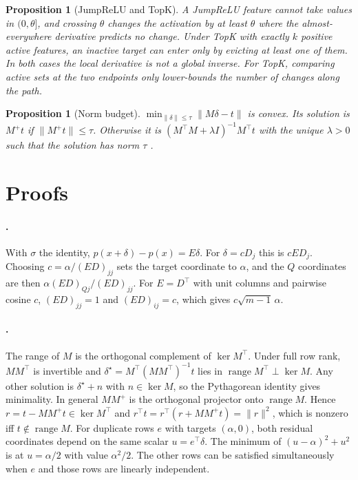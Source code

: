 \documentclass{article}
\theoremstyle{plain}
\newtheorem{proposition}[theorem]{Proposition}
\theoremstyle{definition}
\theoremstyle{remark}
\begin{document}
\begin{proposition}[JumpReLU and TopK]
\label{prop:jump}
A JumpReLU feature cannot take values in $(0,\theta]$, and crossing $\theta$ changes the
activation by at least $\theta$ where the almost-everywhere derivative predicts no change.
Under TopK with exactly $k$ positive active features, an inactive target can enter only by
evicting at least one of them. In both cases the local derivative is not a global inverse.
For TopK, comparing active sets at the two endpoints only lower-bounds the number of
changes along the path.
\end{proposition}

\begin{proposition}[Norm budget]
\label{prop:tr}
$\min_{\|\delta\|\le\tau}\|M\delta - t\|$ is convex. Its solution is $M^{+}t$ if
$\|M^{+}t\|\le\tau$. Otherwise it is $(M^{\top}M+\lambda I)^{-1}M^{\top}t$ with the unique
$\lambda>0$ such that the solution has norm $\tau$ \citep{more1983computing}.
\end{proposition}

\section{Proofs}
\label{app:proofs}
\paragraph{.}
With $\sigma$ the identity, $p(x+\delta) - p(x) = E\delta$. For $\delta = cD_j$ this is
$cED_j$. Choosing $c = \alpha/(ED)_{jj}$ sets the target coordinate to $\alpha$, and the
$Q$ coordinates are then $\alpha(ED)_{Qj}/(ED)_{jj}$. For $E = D^{\top}$ with unit columns
and pairwise cosine $c$, $(ED)_{jj} = 1$ and $(ED)_{ij} = c$, which gives
$c\sqrt{m-1}\,\alpha$.

\paragraph{.}
The range of $M$ is the orthogonal complement of $\ker M^{\top}$. Under full row rank,
$MM^{\top}$ is invertible and $\delta^\star = M^{\top}(MM^{\top})^{-1}t$ lies in
$\operatorname{range}M^{\top}\perp\ker M$. Any other solution is $\delta^\star + n$ with
$n\in\ker M$, so the Pythagorean identity gives minimality. In general $MM^{+}$ is the
orthogonal projector onto $\operatorname{range}M$. Hence $r = t - MM^{+}t\in\ker M^{\top}$
and $r^{\top}t = r^{\top}(r + MM^{+}t) = \|r\|^2$, which is nonzero iff $t\notin\operatorname{range}M$.
For duplicate rows $e$ with targets $(\alpha,0)$, both residual coordinates depend on the
same scalar $u = e^{\top}\delta$. The minimum of $(u-\alpha)^2 + u^2$ is at $u=\alpha/2$ with
value $\alpha^2/2$. The other rows can be satisfied simultaneously when $e$ and those rows
are linearly independent.
\end{document}
